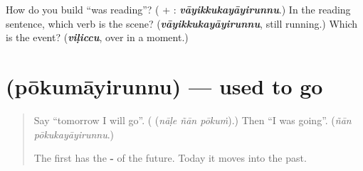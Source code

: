 \begin{tcolorbox}[breakable,colback=teal!4,colframe=teal!35!black,title={Before you move on}]
How do you build \textquotedblleft{}was reading\textquotedblright{}? (\textbf{} + \textbf{}: \emph{\textbf{vāyikkukayāyirunnu}}.) In the reading sentence, which verb is the scene? (\emph{\textbf{vāyikkukayāyirunnu}}, still running.) Which is the event? (\emph{\textbf{viḷiccu}}, over in a moment.)
\end{tcolorbox}
\section[\texorpdfstring{\ml{പോകുമായിരുന്നു} (pōkumāyirunnu)}{പോകുമായിരുന്നു (pōkumāyirunnu)}]{ (pōkumāyirunnu) — used to go}

\label{lesson:ML-C339-pokumayirunnu}



\begin{quote}
Say \textquotedblleft{}tomorrow I will go\textquotedblright{}. (\textbf{  } (\emph{nāḷe ñān pōkuṁ}).) Then \textquotedblleft{}I was going\textquotedblright{}. (\emph{ñān pōkukayāyirunnu}.)

The first has the \textbf{-} of the future. Today it moves into the past.
\end{quote}

